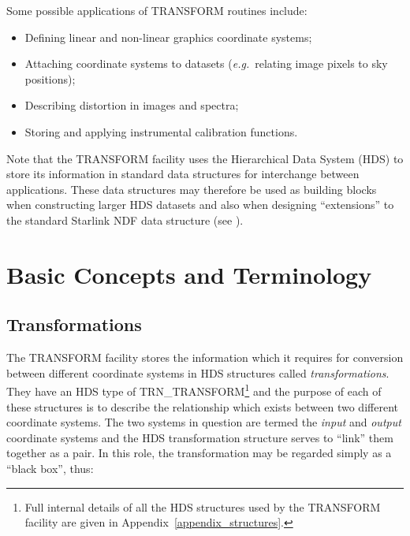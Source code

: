 \documentclass[twoside,nolof,11pt]{starlink}
\providecommand{\name}[1]{\small{#1}}
\begin{document}
Some possible applications of \name{TRANSFORM} routines include:

\begin{itemize}
\item Defining linear and non-linear graphics coordinate systems;
\item Attaching coordinate systems to datasets (\emph{e.g.}\ relating image
pixels to sky positions);
\item Describing distortion in images and spectra;
\item Storing and applying instrumental calibration functions.
\end{itemize}

Note that the \name{TRANSFORM} facility uses the Hierarchical Data System
\name{(HDS)} to store its information in standard data structures for
interchange between applications.
These data structures may therefore be used as building blocks when
constructing larger \name{HDS} datasets and also when designing
``extensions'' to the standard Starlink \name{NDF} data structure (see
).

\section{Basic Concepts and Terminology}

\subsection{Transformations}

The \name{TRANSFORM} facility stores the information which it requires for
conversion between different coordinate systems in \name{HDS} structures
called \emph{transformations}.
They have an \name{HDS} type of \name{TRN\_TRANSFORM}\footnote{
Full internal details of all the \name{HDS} structures used by the
\name{TRANSFORM} facility are given in Appendix~\ref{appendix_structures}.}
and the purpose of each of these structures is to describe the relationship
which exists between two different coordinate systems.
The two systems in question are termed the \emph{input} and \emph{output}
coordinate systems and the \name{HDS} transformation structure serves to
``link'' them together as a pair.
In this role, the transformation may be regarded simply as a ``black box'',
thus:
\end{document}
